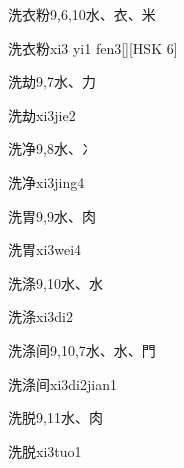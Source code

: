 \begin{Entry}{洗衣粉}{9,6,10}{⽔、⾐、⽶}
  \begin{Phonetics}{洗衣粉}{xi3 yi1 fen3}[][HSK 6]
  \end{Phonetics}
\end{Entry}

\begin{Entry}{洗劫}{9,7}{⽔、⼒}
  \begin{Phonetics}{洗劫}{xi3jie2}
  \end{Phonetics}
\end{Entry}

\begin{Entry}{洗净}{9,8}{⽔、⼎}
  \begin{Phonetics}{洗净}{xi3jing4}
  \end{Phonetics}
\end{Entry}

\begin{Entry}{洗胃}{9,9}{⽔、⾁}
  \begin{Phonetics}{洗胃}{xi3wei4}
  \end{Phonetics}
\end{Entry}

\begin{Entry}{洗涤}{9,10}{⽔、⽔}
  \begin{Phonetics}{洗涤}{xi3di2}
  \end{Phonetics}
\end{Entry}

\begin{Entry}{洗涤间}{9,10,7}{⽔、⽔、⾨}
  \begin{Phonetics}{洗涤间}{xi3di2jian1}
  \end{Phonetics}
\end{Entry}

\begin{Entry}{洗脱}{9,11}{⽔、⾁}
  \begin{Phonetics}{洗脱}{xi3tuo1}
  \end{Phonetics}
\end{Entry}

